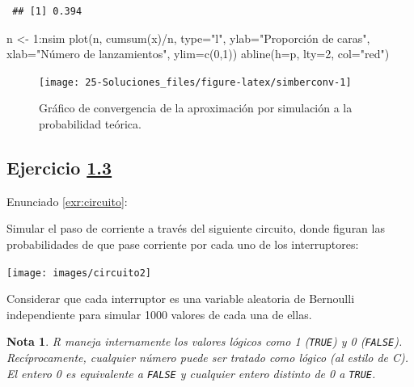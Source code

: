 \documentclass[
  10pt,
]{book}
\newenvironment{Shaded}{\begin{snugshade}}{\end{snugshade}}
\newcommand{\AttributeTok}[1]{\textcolor[rgb]{0.77,0.63,0.00}{#1}}
\newcommand{\DecValTok}[1]{\textcolor[rgb]{0.00,0.00,0.81}{#1}}
\newcommand{\FunctionTok}[1]{\textcolor[rgb]{0.00,0.00,0.00}{#1}}
\newcommand{\NormalTok}[1]{#1}
\newcommand{\OtherTok}[1]{\textcolor[rgb]{0.56,0.35,0.01}{#1}}
\newcommand{\SpecialCharTok}[1]{\textcolor[rgb]{0.00,0.00,0.00}{#1}}
\newcommand{\StringTok}[1]{\textcolor[rgb]{0.31,0.60,0.02}{#1}}
\theoremstyle{break}
\theoremstyle{nonumberplain}
\newtheorem{remark}{Nota}
\begin{document}
\begin{verbatim}
 ## [1] 0.394
\end{verbatim}

\begin{Shaded}
\begin{Highlighting}[]
\NormalTok{n }\OtherTok{\textless{}{-}} \DecValTok{1}\SpecialCharTok{:}\NormalTok{nsim}
\FunctionTok{plot}\NormalTok{(n, }\FunctionTok{cumsum}\NormalTok{(x)}\SpecialCharTok{/}\NormalTok{n, }\AttributeTok{type=}\StringTok{"l"}\NormalTok{, }\AttributeTok{ylab=}\StringTok{"Proporción de caras"}\NormalTok{, }
     \AttributeTok{xlab=}\StringTok{"Número de lanzamientos"}\NormalTok{, }\AttributeTok{ylim=}\FunctionTok{c}\NormalTok{(}\DecValTok{0}\NormalTok{,}\DecValTok{1}\NormalTok{))}
\FunctionTok{abline}\NormalTok{(}\AttributeTok{h=}\NormalTok{p, }\AttributeTok{lty=}\DecValTok{2}\NormalTok{, }\AttributeTok{col=}\StringTok{"red"}\NormalTok{)}
\end{Highlighting}
\end{Shaded}

\begin{figure}[!htbp]

{\centering \texttt{[image: 25-Soluciones\_files/figure-latex/simberconv-1]} 

}

\caption{Gráfico de convergencia de la aproximación por simulación a la probabilidad teórica.}\label{fig:simberconv}
\end{figure}

\hypertarget{sol-circuito}{%
\subsection{\texorpdfstring{Ejercicio \href{ejercicios.html\#exr:circuito}{1.3}}{Ejercicio 1.3}}\label{sol-circuito}}

Enunciado \ref{exr:circuito}:

Simular el paso de corriente a través del siguiente circuito, donde
figuran las probabilidades de que pase corriente por cada uno de los
interruptores:

\begin{center}\texttt{[image: images/circuito2]} \end{center}

Considerar que cada interruptor es una variable aleatoria de Bernoulli independiente
para simular 1000 valores de cada una de ellas.

\begin{remark}
R maneja internamente los valores lógicos como 1 (\texttt{TRUE}) y 0 (\texttt{FALSE}).
Recíprocamente, cualquier número puede ser tratado como lógico (al estilo de C).
El entero 0 es equivalente a \texttt{FALSE} y cualquier entero distinto de 0 a \texttt{TRUE}.
\end{remark}
\end{document}
